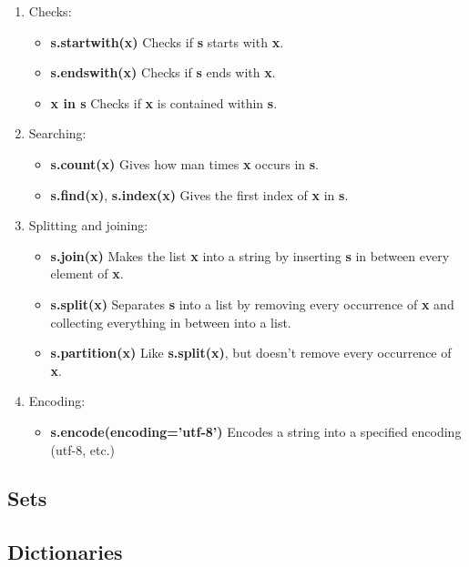 \documentclass[a4paper, twoside, 8pt]{extarticle}
\newenvironment{enumx} {
	\begin{enumerate}[leftmargin=*]
	\setlength{\topsep}{0pt}
	\setlength{\itemsep}{0pt}
	\setlength{\parskip}{0pt}
	\setlength{\parsep}{0pt}
	}
{\end{enumerate}}
\newenvironment{itemx} {
	\begin{itemize}[leftmargin=*,noitemsep,topsep=0pt]
	}
{\end{itemize}}
\newcommand{\python}[1] {\textbf{\color{blue}#1}}
\begin{document}
\begin{multicols*}{3}
\begin{enumx}
\begin{itemx}
	\item \python{s.strip} Removes leading and trailing spaces.
\end{itemx}

\item Checks:
\begin{itemx}
    \item \python{s.startwith(x)} Checks if \python{s} starts with \python{x}.
    \item \python{s.endswith(x)} Checks if \python{s} ends with \python{x}.
    \item \python{x in s} Checks if \python{x} is contained within \python{s}.
\end{itemx}


\item Searching:
\begin{itemx}
\item \python{s.count(x)} Gives how man times \python{x} occurs in \python{s}.
\item \python{s.find(x)}, \python{s.index(x)} Gives the first index of \python{x} in \python{s}.
\end{itemx}

\item Splitting and joining:
\begin{itemx}
    \item \python{s.join(x)} Makes the list \python{x} into a string by inserting \python{s} in between every element of \python{x}.
    \item \python{s.split(x)} Separates \python{s} into a list by removing every occurrence of \python{x} and collecting everything in between into a list.
    \item \python{s.partition(x)} Like \python{s.split(x)}, but doesn't remove every occurrence of \python{x}.
\end{itemx}

\item Encoding: 
\begin{itemx}
    \item \python{s.encode(encoding='utf-8')} Encodes a string into a specified encoding (utf-8, etc.)
\end{itemx}
\end{enumx}

\subsection{Sets}

\subsection{Dictionaries}

\end{multicols*}
\end{document}
